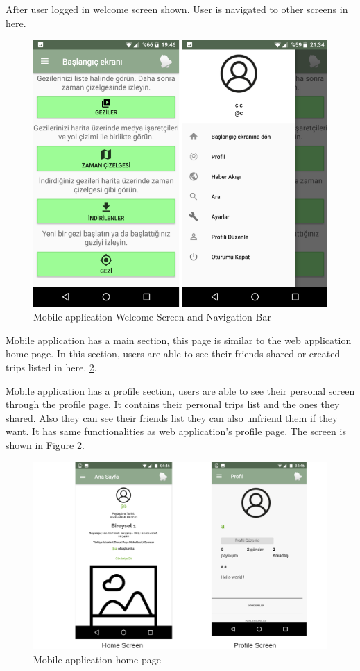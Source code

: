 \newpage
After user logged in welcome screen shown. User is navigated to other screens in here. 

\begin{figure}[!htbp]
\centering
\includegraphics[width=\textwidth]{projectChapters/images/baslangic.png}
\caption{Mobile application Welcome Screen and Navigation Bar}
\label{fig:phoneLogin}
\end{figure}

Mobile application has a main section, this page is similar to the web application home page. In this section, users are able to see their friends shared or created trips listed in here.  
\ref{fig:phoneHome}.

Mobile application has a profile section, users are able to see their personal screen through the profile page. It contains their personal trips list and the ones they shared. Also they can see their friends list they can also unfriend them if they want. It has same functionalities as web application's profile page. The screen is shown in Figure 
\ref{fig:phoneHome}.

\begin{figure}[!htbp]
\centering
\includegraphics[width=\textwidth]{projectChapters/images/phoneHome.png}
\caption{Mobile application home page}
\label{fig:phoneHome}
\end{figure}


